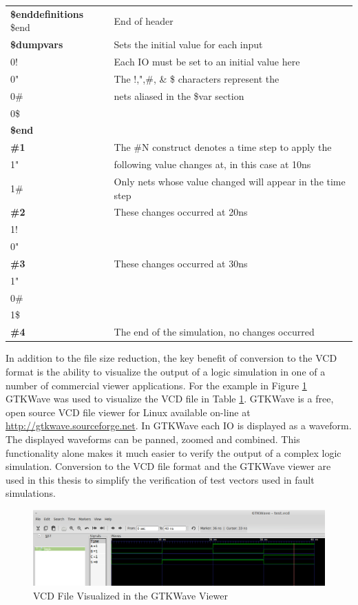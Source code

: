 \documentclass[12pt]{report}
\begin{document}
\begin{table}
\begin{center}
\begin{tabular}{l|l}
			\textbf{\$enddefinitions} \$end & End of header \\
			\textbf{\$dumpvars} & Sets the initial value for each input \\
			0!	& Each IO must be set to an initial value here \\
			0"	& The !,",\#, \& \$ characters represent the\\
			0\# & nets aliased in the \$var section\\
			0\$ & \\
			\textbf{\$end} & \\
			\textbf{\#1} & The \#N construct denotes a time step to apply the \\
			1" & following value changes at, in this case at 10ns \\
			1\# & Only nets whose value changed will appear in the time step\\
			\textbf{\#2} & These changes occurred at 20ns \\ 
			1! & \\
			0" & \\
			\textbf{\#3} & These changes occurred at 30ns\\
			1" & \\
			0\# & \\
			1\$ & \\	
			\textbf{\#4} & The end of the simulation, no changes occurred \\		
		\end{tabular}
	\end{center}
	\label{tbl:half_adder_vcd}
\end{table} 
In addition to the file size reduction, the key benefit of conversion to the VCD format is the ability to visualize the output of a logic simulation in one of a number of commercial viewer applications.  For the example in Figure \ref{fig:half-adder-gtkwave} GTKWave was used to visualize the VCD file in Table \ref{tbl:half_adder_vcd}.  GTKWave is a free, open source VCD file viewer for Linux available on-line at \url{http://gtkwave.sourceforge.net}.  In GTKWave each IO is displayed as a waveform.  The displayed waveforms can be panned, zoomed and combined.  This functionality alone makes it much easier to verify the output of a complex logic simulation.  Conversion to the VCD file format and the GTKWave viewer are used in this thesis to simplify the verification of test vectors used in fault simulations.
\begin{figure}
	\begin{center}
		\includegraphics[scale=.4]{images/half-adder-vcd}
	\end{center}
	\caption{VCD File Visualized in the GTKWave Viewer}
	\label{fig:half-adder-gtkwave}
\end{figure}
\end{document}
